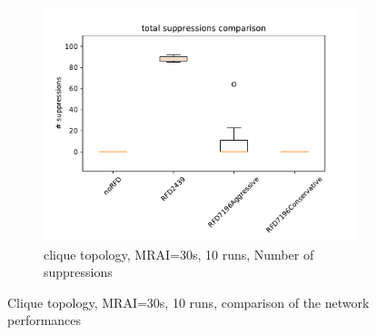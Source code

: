 \begin{figure}[h]
\begin{subfigure}[b]{0.3\textwidth}
         \label{fig:RFD_MRAI30_convTime}
     \end{subfigure}
     \hfill
     \begin{subfigure}[b]{0.3\textwidth}
         \centering
         \includegraphics[width=\textwidth]{images/RFD/clique/clique_rfd_comparison_suppressions_boxplot.pdf}
         \caption{clique topology, MRAI=30s, 10 runs, Number of suppressions}
         \label{fig:RFD_MRAI30_suppressions}
     \end{subfigure}
        \caption{Clique topology, MRAI=30s, 10 runs, comparison of the network performances}
        \label{fig:RFD_MRAI30}
\end{figure}

\clearpage

